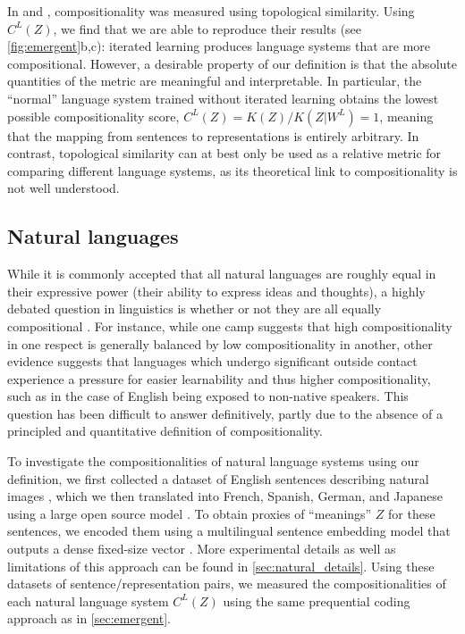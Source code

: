 \documentclass{article} %
\begin{document}
In \citet{li2019ease} and \citet{ren2020compositional}, compositionality was measured using topological similarity. Using $C^L(Z)$, we find that we are able to reproduce their results (see \cref{fig:emergent}b,c): iterated learning produces language systems that are more compositional. However, a desirable property of our definition is that the absolute quantities of the metric are meaningful and interpretable. In particular, the ``normal'' language system trained without iterated learning obtains the lowest possible compositionality score, $C^L(Z) = K(Z) / K(Z|W^L) = 1$, meaning that the mapping from sentences to representations is entirely arbitrary. In contrast, topological similarity can at best only be used as a relative metric for comparing different language systems, as its theoretical link to compositionality is not well understood.


\subsection{Natural languages}
\label{sec:natural}

While it is commonly accepted that all natural languages are roughly equal in their expressive power (their ability to express ideas and thoughts), a highly debated question in linguistics is whether or not they are all equally compositional \citep{joseph2012all}. For instance, while one camp suggests that high compositionality in one respect is generally balanced by low compositionality in another, other evidence suggests that languages which undergo significant outside contact experience a pressure for easier learnability and thus higher compositionality, such as in the case of English being exposed to non-native speakers. This question has been difficult to answer definitively, partly due to the absence of a principled and quantitative definition of compositionality.

To investigate the compositionalities of natural language systems using our definition, we first collected a dataset of English sentences describing natural images \citep{coco-captions}, which we then translated into French, Spanish, German, and Japanese using a large open source model \citep{costa2022no}. To obtain proxies of ``meanings'' $Z$ for these sentences, we encoded them using a multilingual sentence embedding model that outputs a dense fixed-size vector \citep{reimers-2020-multilingual-sentence-bert}. More experimental details as well as limitations of this approach can be found in \cref{sec:natural_details}. 
Using these datasets of sentence/representation pairs, we measured the compositionalities of each natural language system $C^L(Z)$ using the same prequential coding approach as in \cref{sec:emergent}.
\end{document}
